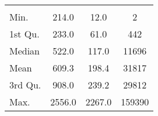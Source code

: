\begin{tabular}{lS[table-format=5.1]S[table-format=5.1]S[table-format=5.1]}
&  &  &  \\
 Min.    & 214.0 & 12.0 & 2 \\
 1st Qu. & 233.0 & 61.0 & 442 \\
 Median  & 522.0 & 117.0 & 11696 \\
 Mean    & 609.3 & 198.4 & 31817 \\
 3rd Qu. & 908.0 & 239.2 & 29812 \\
 Max.    & 2556.0 & 2267.0 & 159390 \\
\end{tabular}

